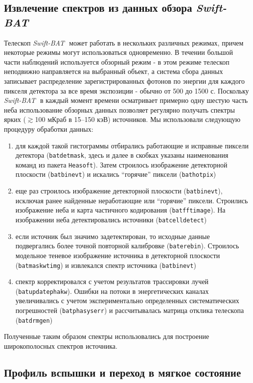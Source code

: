 \documentclass{pazhb}
\def\swiftb{{\em Swift-BAT\,}}
\begin{document}
\subsection{Извлечение спектров из данных обзора \swiftb}	
Телескоп \swiftb\, может работать в нескольких различных режимах, причем некоторые режимы могут использоваться одновременно. В течении большой части наблюдений используется обзорный режим - в этом режиме телескоп неподвижно направляется на выбранный объект, а система сбора данных записывает распределение зарегистрированных фотонов по энергии для каждого пикселя детектора за все время экспозиции - обычно от 500 до 1500 с. Поскольку \swiftb\, в каждый момент времени осматривает примерно одну шестую часть неба использование обзорных данных позволяет регулярно получать спектры ярких ($\gtrsim$100 мКраб в 15--150 кэВ) источников.
Мы использовали следующую процедуру обработки данных:
\begin{enumerate}
\item    для каждой такой гистограммы отбирались работающие и исправные пиксели детектора (\texttt{batdetmask}, здесь и далее в скобках указаны наименования команд из пакета \texttt{Heasoft}). Затем строилось изображение детекторной плоскости (\texttt{batbinevt})  и искались ``горячие'' пиксели (\texttt{bathotpix})
\item   еще раз строилось изображение детекторной плоскости (\texttt{batbinevt}), исключая ранее найденные неработающие или ``горячие'' пиксели. Строились изображение неба и карта частичного кодирования (\texttt{batfftimage}). На изображении неба детектировались источники (\texttt{batcelldetect})
\item если источник был значимо задетектирован, то исходные данные подвергались более точной повторной калибровке (\texttt{baterebin}). Строилось модельное теневое изображение источника в детекторной плоскости  (\texttt{batmaskwtimg}) и извлекался спектр источника (\texttt{batbinevt})
\item спектр корректировался с учетом результатов трассировки лучей (\texttt{batupdatephakw}). Ошибки на потоки в энергетических каналах увеличивались с учетом экспериментально определенных систематических погрешностей (\texttt{batphasyserr}) и рассчитывалась матрица отклика телескопа (\texttt{batdrmgen})
\end{enumerate}    

Полученные таким образом спектры использовались для построение широкополосных спектров источника.

\subsection{Профиль вспышки и переход в мягкое состояние}	
\end{document}
